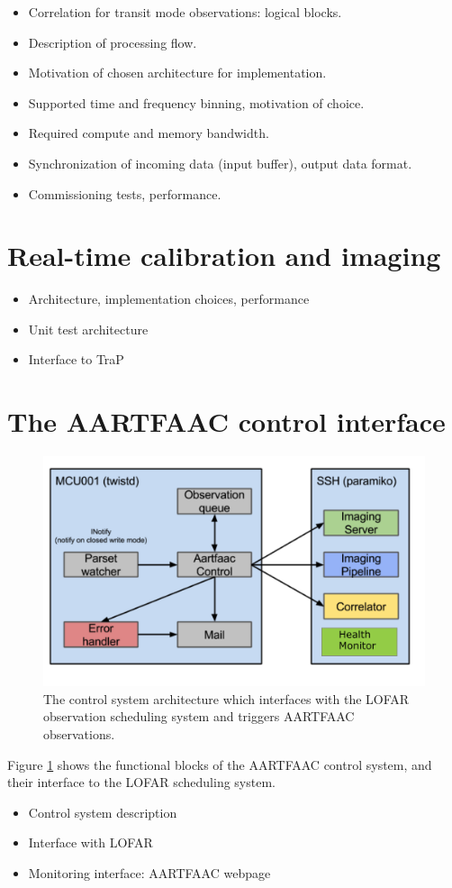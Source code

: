 \documentclass{aa}
\begin{document}
\begin {itemize}
 \item {Correlation for transit mode observations: logical blocks.}
 \item {Description of processing flow.} 
 \item {Motivation of chosen architecture for implementation.}
 \item {Supported time and frequency binning, motivation of choice.}
 \item {Required compute and memory bandwidth.}
 \item {Synchronization of incoming data (input buffer), output data format.}
 \item {Commissioning tests, performance.}
\end {itemize}

\section {\label{sec:calim} Real-time calibration and imaging}
\begin {itemize}
 \item {Architecture, implementation choices, performance}
 \item {Unit test architecture}
 \item {Interface to TraP}
\end {itemize}

\section {\label{sec:acontrol} The AARTFAAC control interface}
\begin{figure}[htbp]
\centering
\includegraphics[width=1\textwidth]{Figs/control_sys.png}
\caption{The  control  system  architecture  which  interfaces  with  the  LOFAR
  observation scheduling system and triggers AARTFAAC observations.}
\label{fig:afaac_ctrl_sys}
\end{figure}
Figure  \ref{fig:afaac_ctrl_sys} shows  the  functional blocks  of the  AARTFAAC
control system, and their interface to the LOFAR scheduling system.
\begin {itemize}
 \item {Control system description}
 \item {Interface with LOFAR}
 \item {Monitoring interface: AARTFAAC webpage}
\end {itemize}
\end{document}
